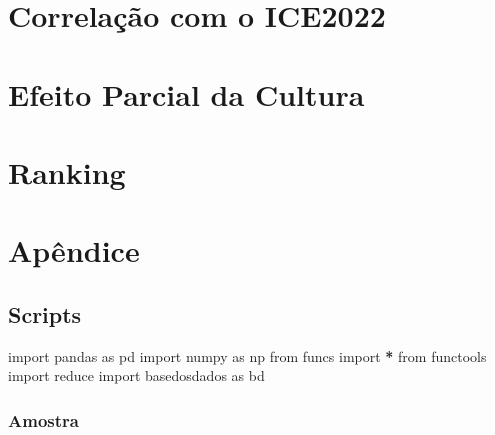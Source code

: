 \documentclass[
  12,
  dvipsnames]{article}
\newenvironment{Shaded}{\begin{snugshade}}{\end{snugshade}}
\newcommand{\BuiltInTok}[1]{#1}
\newcommand{\ImportTok}[1]{#1}
\newcommand{\NormalTok}[1]{#1}
\newcommand{\OperatorTok}[1]{\textcolor[rgb]{0.81,0.36,0.00}{\textbf{#1}}}
\begin{document}
\hypertarget{correlauxe7uxe3o-com-o-ice2022}{%
\section{Correlação com o
ICE2022}\label{correlauxe7uxe3o-com-o-ice2022}}

\hypertarget{efeito-parcial-da-cultura}{%
\section{Efeito Parcial da Cultura}\label{efeito-parcial-da-cultura}}

\hypertarget{ranking}{%
\section{Ranking}\label{ranking}}

\hypertarget{apend}{%
\section*{Apêndice}\label{apend}}

\hypertarget{script_ind}{%
\subsection*{Scripts}\label{script_ind}}

\begin{Shaded}
\begin{Highlighting}[]
\ImportTok{import}\NormalTok{ pandas }\ImportTok{as}\NormalTok{ pd}
\ImportTok{import}\NormalTok{ numpy }\ImportTok{as}\NormalTok{ np}
\ImportTok{from}\NormalTok{ funcs }\ImportTok{import} \OperatorTok{*}
\ImportTok{from}\NormalTok{ functools }\ImportTok{import} \BuiltInTok{reduce}
\ImportTok{import}\NormalTok{ basedosdados }\ImportTok{as}\NormalTok{ bd}
\end{Highlighting}
\end{Shaded}

\hypertarget{amostra}{%
\subsubsection*{Amostra}\label{amostra}}
\end{document}
